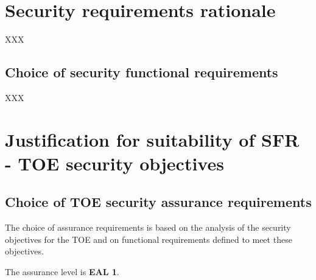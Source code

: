 \documentclass[10pt,a4paper,english]{book}
\begin{document}

\hypertarget{security-requirements-rationale}{}
\section{Security requirements rationale}

XXX



\hypertarget{choice-of-security-functional-requirements}{}
\subsection{Choice of security functional requirements}

XXX



\hypertarget{justification-for-suitability-of-sfr-toe-security-objectives}{}
\section{Justification for suitability of SFR - TOE security objectives}



\hypertarget{choice-of-toe-security-assurance-requirements}{}
\subsection{Choice of TOE security assurance requirements}

The choice of assurance requirements is based on the analysis of the security
objectives for the TOE and on functional requirements defined to meet these
objectives.

The assurance level is \textbf{EAL 1}.


\end{document}
